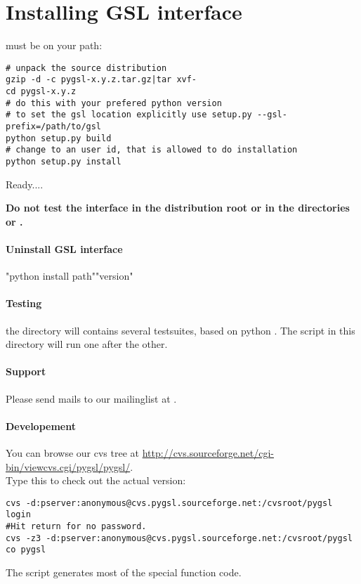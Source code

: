 \section{Installing GSL interface}

 must be on your path:\nopagebreak
\begin{verbatim}
# unpack the source distribution
gzip -d -c pygsl-x.y.z.tar.gz|tar xvf-
cd pygsl-x.y.z
# do this with your prefered python version
# to set the gsl location explicitly use setup.py --gsl-prefix=/path/to/gsl
python setup.py build
# change to an user id, that is allowed to do installation
python setup.py install
\end{verbatim}
Ready....

{\bf Do not test the interface in the distribution root or in the directories  or .}

\paragraph*{Uninstall GSL interface}
"python install path""version"

\paragraph*{Testing}
the directory  will contains several testsuites, based on python .
The script  in this directory will run one after the other.

\paragraph*{Support}
Please send mails to our mailinglist at .

\paragraph*{Developement}
You can browse our cvs tree at \url{http://cvs.sourceforge.net/cgi-bin/viewcvs.cgi/pygsl/pygsl/}.
\\
Type this to check out the actual version:
\begin{verbatim}
cvs -d:pserver:anonymous@cvs.pygsl.sourceforge.net:/cvsroot/pygsl login
#Hit return for no password.
cvs -z3 -d:pserver:anonymous@cvs.pygsl.sourceforge.net:/cvsroot/pygsl co pygsl
\end{verbatim}
The script  generates most of the special function code.

